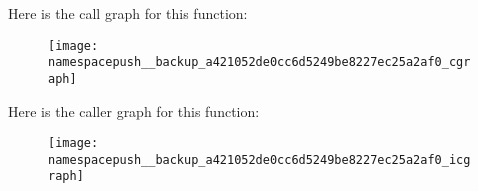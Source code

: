 Here is the call graph for this function\-:
\nopagebreak
\begin{figure}[H]
\begin{center}
\leavevmode
\texttt{[image: namespacepush\_\_backup\_a421052de0cc6d5249be8227ec25a2af0\_cgraph]}
\end{center}
\end{figure}




Here is the caller graph for this function\-:
\nopagebreak
\begin{figure}[H]
\begin{center}
\leavevmode
\texttt{[image: namespacepush\_\_backup\_a421052de0cc6d5249be8227ec25a2af0\_icgraph]}
\end{center}
\end{figure}


